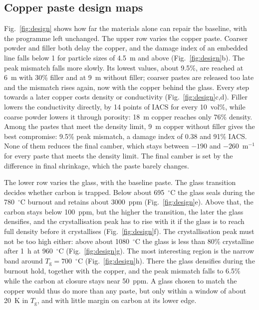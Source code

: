 \subsection{Copper paste design maps}
\label{sec:res_design}

Fig.~\ref{fig:design} shows how far the materials alone can repair the baseline, with the programme left unchanged. The upper row varies the copper paste. Coarser powder and filler both delay the copper, and the damage index of an embedded line falls below 1 for particle sizes of 4.5~\textmu m and above (Fig.~\ref{fig:design}b). The peak mismatch falls more slowly. Its lowest values, about 9.5\%, are reached at 6~\textmu m with 30\% filler and at 9~\textmu m without filler; coarser pastes are released too late and the mismatch rises again, now with the copper behind the glass. Every step towards a later copper costs density or conductivity (Fig.~\ref{fig:design}c,d). Filler lowers the conductivity directly, by 14 points of IACS for every 10~vol\%, while coarse powder lowers it through porosity: 18~\textmu m copper reaches only 76\% density. Among the pastes that meet the density limit, 9~\textmu m copper without filler gives the best compromise: 9.5\% peak mismatch, a damage index of 0.38 and 91\% IACS. None of them reduces the final camber, which stays between $-190$ and $-260$~m$^{-1}$ for every paste that meets the density limit. The final camber is set by the difference in final shrinkage, which the paste barely changes.

The lower row varies the glass, with the baseline paste. The glass transition decides whether carbon is trapped. Below about 695~$^\circ$C the glass seals during the 780~$^\circ$C burnout and retains about 3000~ppm (Fig.~\ref{fig:design}e). Above that, the carbon stays below 100~ppm, but the higher the transition, the later the glass densifies, and the crystallisation peak has to rise with it if the glass is to reach full density before it crystallises (Fig.~\ref{fig:design}f). The crystallisation peak must not be too high either: above about 1080~$^\circ$C the glass is less than 80\% crystalline after 1~h at 960~$^\circ$C (Fig.~\ref{fig:design}g). The most interesting region is the narrow band around $T_{\mathrm{g}} = 700$~$^\circ$C (Fig.~\ref{fig:design}h). There the glass densifies during the burnout hold, together with the copper, and the peak mismatch falls to 6.5\% while the carbon at closure stays near 50~ppm. A glass chosen to match the copper would thus do more than any paste, but only within a window of about 20~K in $T_{\mathrm{g}}$, and with little margin on carbon at its lower edge.

